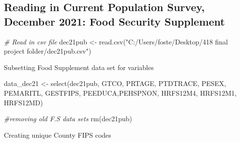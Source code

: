 \documentclass[
]{article}
\newenvironment{Shaded}{\begin{snugshade}}{\end{snugshade}}
\newcommand{\CommentTok}[1]{\textcolor[rgb]{0.56,0.35,0.01}{\textit{#1}}}
\newcommand{\FunctionTok}[1]{\textcolor[rgb]{0.00,0.00,0.00}{#1}}
\newcommand{\NormalTok}[1]{#1}
\newcommand{\OtherTok}[1]{\textcolor[rgb]{0.56,0.35,0.01}{#1}}
\newcommand{\StringTok}[1]{\textcolor[rgb]{0.31,0.60,0.02}{#1}}
\begin{document}
\hypertarget{reading-in-current-population-survey-december-2021-food-security-supplement}{%
\subsection{Reading in Current Population Survey, December 2021: Food
Security
Supplement}\label{reading-in-current-population-survey-december-2021-food-security-supplement}}

\begin{Shaded}
\begin{Highlighting}[]
\CommentTok{\# Read in csv file}
\NormalTok{dec21pub }\OtherTok{\textless{}{-}} \FunctionTok{read.csv}\NormalTok{(}\StringTok{"C:/Users/foste/Desktop/418 final project folder/dec21pub.csv"}\NormalTok{)}
\end{Highlighting}
\end{Shaded}

Subsetting Food Supplement data set for variables

\begin{Shaded}
\begin{Highlighting}[]
\NormalTok{data\_dec21 }\OtherTok{\textless{}{-}} \FunctionTok{select}\NormalTok{(dec21pub, GTCO, PRTAGE, PTDTRACE, PESEX, }
\NormalTok{                     PEMARITL, GESTFIPS, PEEDUCA,PEHSPNON, HRFS12M4, HRFS12M1, HRFS12MD)}

\CommentTok{\#removing old F.S data sets}
\FunctionTok{rm}\NormalTok{(dec21pub)}
\end{Highlighting}
\end{Shaded}

Creating unique County FIPS codes
\end{document}
